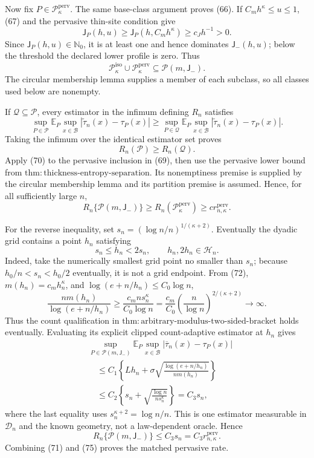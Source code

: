 Now fix \(P\in\mathcal P_\kappa^{\mathrm{perv}}\).  The same base-class
argument proves (66).  If \(C_mh^\kappa\le u\le1\), (67) and the
pervasive thin-site condition give
\[
 \mathsf J_P(h,u)\ge\mathsf J_P(h,C_mh^\kappa)
 \ge c_Jh^{-1}>0.
\]
Since \(\mathsf J_P(h,u)\in\mathbb N_0\), it is at least one and hence
dominates \(\mathsf J_{-}(h,u)\); below the threshold the declared lower
profile is zero.  Thus
\[
 \mathcal P_\kappa^{\mathrm{iso}}\cup
 \mathcal P_\kappa^{\mathrm{perv}}
 \subseteq\mathcal P(m,\mathsf J_{-}).
 \tag{69}
\]
The circular membership lemma supplies a member of each subclass, so all
classes used below are nonempty.

If \(\mathcal Q\subseteq\mathcal P\), every estimator in the infimum
defining \(R_n\) satisfies
\[
 \sup_{P\in\mathcal P}\mathbb E_P\sup_{x\in\mathcal B}
 |\widetilde\tau_n(x)-\tau_P(x)|
 \ge
 \sup_{P\in\mathcal Q}\mathbb E_P\sup_{x\in\mathcal B}
 |\widetilde\tau_n(x)-\tau_P(x)|.
\]
Taking the infimum over the identical estimator set proves
\[
 R_n(\mathcal P)\ge R_n(\mathcal Q).
 \tag{70}
\]
Apply (70) to the pervasive inclusion in (69), then use the pervasive
lower bound from
\(\mathrm{thm:thickness\text{-}entropy\text{-}separation}\).  Its
nonemptiness premise is supplied by the circular membership lemma and
its partition premise is assumed.  Hence, for all sufficiently large
\(n\),
\[
 R_n\{\mathcal P(m,\mathsf J_{-})\}
 \ge R_n(\mathcal P_\kappa^{\mathrm{perv}})
 \ge c r_{n,\kappa}^{\mathrm{perv}}.
 \tag{71}
\]

For the reverse inequality, set
\(s_n=(\log n/n)^{1/(\kappa+2)}\).  Eventually the dyadic grid contains
a point \(h_n\) satisfying
\[
 s_n\le h_n<2s_n,
 \qquad h_n,2h_n\in\mathcal H_n.
 \tag{72}
\]
Indeed, take the numerically smallest grid point no smaller than \(s_n\);
because \(h_0/n<s_n<h_0/2\) eventually, it is not a grid endpoint.  From
(72), \(m(h_n)=c_mh_n^\kappa\), and
\(\log(e+n/h_n)\le C_0\log n\),
\[
 \frac{nm(h_n)}{\log(e+n/h_n)}
 \ge\frac{c_mns_n^\kappa}{C_0\log n}
 =\frac{c_m}{C_0}
 \left(\frac n{\log n}\right)^{2/(\kappa+2)}
 \longrightarrow\infty.
 \tag{73}
\]
Thus the count qualification in
\(\mathrm{thm:arbitrary\text{-}modulus\text{-}two\text{-}sided\text{-}bracket}\)
holds eventually.  Evaluating its explicit clipped count-adaptive
estimator at \(h_n\) gives
\[
 \begin{aligned}
 &\sup_{P\in\mathcal P(m,\mathsf J_{-})}
 \mathbb E_P\sup_{x\in\mathcal B}
 |\overline\tau_n(x)-\tau_P(x)|\\
 &\quad\le C_1\left\{Lh_n+
 \sigma\sqrt{\frac{\log(e+n/h_n)}{nm(h_n)}}\right\}\\
 &\quad\le C_2\left\{s_n+
 \sqrt{\frac{\log n}{ns_n^\kappa}}\right\}
 =C_3s_n,
 \end{aligned}
 \tag{74}
\]
where the last equality uses \(s_n^{\kappa+2}=\log n/n\).  This is one
estimator measurable in \(\mathcal D_n\) and the known geometry, not a
law-dependent oracle.  Hence
\[
 R_n\{\mathcal P(m,\mathsf J_{-})\}
 \le C_3s_n=C_3r_{n,\kappa}^{\mathrm{perv}}.
 \tag{75}
\]
Combining (71) and (75) proves the matched pervasive rate.

